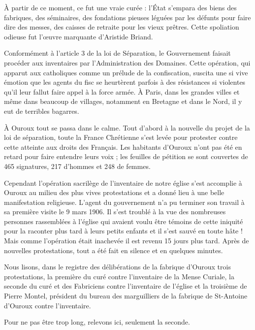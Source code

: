 À partir de ce moment, ce fut une vraie curée : l'État s'empara des
biens des fabriques, des séminaires, des fondations pieuses léguées
par les défunts pour faire dire des messes, des caisses de retraite
pour les vieux prêtres. Cette spoliation odieuse fut l'œuvre marquante d'Aristide Briand.

Conformément à l'article 3 de la loi de Séparation, le Gouvernement faisait procéder aux inventaires par l'Administration des Domaines. Cette opération, qui apparut aux catholiques comme un prélude de la confiscation, suscita une si vive émotion que les agents du fisc se heurtèrent parfois à des résistances si violentes qu'il leur fallut faire appel à la force armée. À Paris, dans les grandes villes et même dans beaucoup de villages, notamment en Bretagne et dans le Nord, il y eut de terribles bagarres.

À Ouroux tout se passa dans le calme. Tout d'abord à la nouvelle du projet de la loi de séparation, toute la France Chrétienne s'est levée pour protester contre cette atteinte aux droits des Français. Les habitants d'Ouroux n'ont pas été en retard pour faire entendre leurs voix ; les feuilles de pétition se sont couvertes de 465 signatures, 217 d'hommes et 248 de femmes.

Cependant l'opération sacrilège de l'inventaire de notre église s'est accomplie à Ouroux au milieu des plus vives protestations et a donné lieu à une belle manifestation religieuse. L'agent du gouvernement n'a pu terminer son travail à sa première visite le 9 mars 1906. Il s'est troublé à la vue des nombreuses personnes rassemblées à l'église qui avaient voulu être témoins de cette iniquité pour la raconter plus tard à leurs petits enfants et il s'est sauvé en toute hâte ! Mais comme l'opération était inachevée il est revenu 15 jours plus tard. Après de nouvelles protestations, tout a été fait en silence et en quelques minutes.

Nous lisons, dans le registre des délibérations de la fabrique d'Ouroux trois protestations, la première du curé contre l'inventaire de la Mense Curiale, la seconde du curé et des Fabriciens contre l'inventaire de l'église et la troisième de Pierre Montel, président du bureau des marguilliers de la fabrique de St-Antoine d'Ouroux contre l'inventaire.

Pour ne pas être trop long, relevons ici, seulement la seconde.

